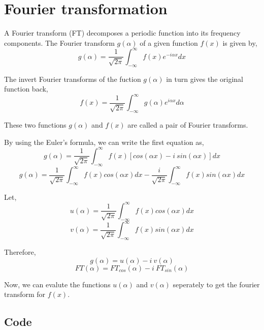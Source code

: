     
    
    

    
    \hypertarget{fourier-transformation}{%
\section{Fourier transformation}\label{fourier-transformation}}

    A Fourier transform (FT) decomposes a periodic function into its
frequency components. The Fourier transform \(g(\alpha)\) of a given
function \(f(x)\) is given by,
\[g(\alpha) = \frac{1}{\sqrt{2\pi}} \int_{-\infty}^{\infty} f(x) e^{-i \alpha x} dx\]

The invert Fourier transforms of the fuction \(g(\alpha)\) in turn gives
the original function back,
\[f(x) = \frac{1}{\sqrt{2\pi}} \int_{-\infty}^{\infty} g(\alpha) e^{i \alpha x} d\alpha\]

These two functions \(g(\alpha)\) and \(f(x)\) are called a pair of
Fourier transforms.

    By using the Euler's formula, we can write the first equation as,
\[g(\alpha) = \frac{1}{\sqrt{2\pi}} \int_{-\infty}^{\infty} f(x) \left[ cos(\alpha x) - i \ sin(\alpha x) \right] dx\]
\[g(\alpha) = \frac{1}{\sqrt{2\pi}} \int_{-\infty}^{\infty} f(x) cos(\alpha x) dx - \frac{i}{\sqrt{2\pi}} \int_{-\infty}^{\infty} f(x) sin(\alpha x) dx\]

Let,
\[u(\alpha) = \frac{1}{\sqrt{2\pi}} \int_{-\infty}^{\infty} f(x) cos(\alpha x) dx\]
\[v(\alpha) = \frac{1}{\sqrt{2\pi}} \int_{-\infty}^{\infty} f(x) sin(\alpha x) dx\]

Therefore, \[g(\alpha) = u(\alpha) - i \ v(\alpha)\]
\[FT(\alpha) = FT_{cos}(\alpha) - i \ FT_{sin}(\alpha)\]

Now, we can evalute the functions \(u(\alpha)\) and \(v(\alpha)\)
seperately to get the fourier transform for \(f(x)\).

    \hypertarget{code}{%
\subsection{Code}\label{code}}

